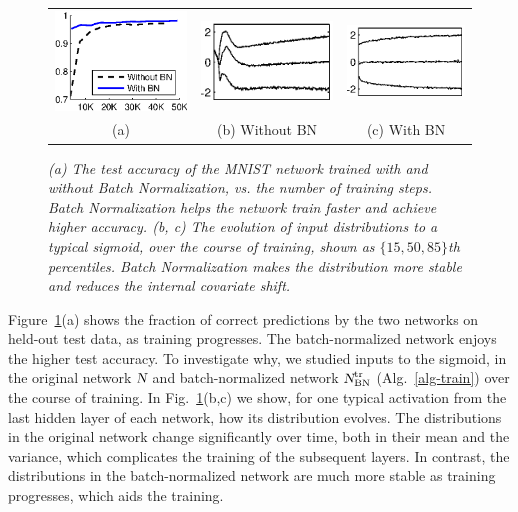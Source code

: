 \documentclass[twocolumn]{article}
\begin{document}
\begin{figure}
\centering
\begin{tabular}{@{}c@{\,}c@{}c@{}}
\includegraphics[width=0.28\columnwidth]{mnist.eps}
&
\includegraphics[width=0.35\columnwidth]{evo.eps}&
\includegraphics[width=0.35\columnwidth]{evo-bn.eps}\\
(a)&(b) Without BN&(c) With BN
\end{tabular} 
\caption{\em {\em(a)} The test accuracy of the MNIST network trained with and without Batch Normalization, vs. the number of training steps. Batch Normalization helps the network train faster and achieve higher accuracy. {\em(b, c)}   The evolution of input distributions to a typical sigmoid, over the course of training, shown as $\{15, 50, 85\}$th percentiles. Batch Normalization makes the distribution more stable and reduces the internal covariate shift.}
\label{fig-mnist}
\end{figure}

Figure~\ref{fig-mnist}(a) shows the fraction of correct predictions  by the two networks on
held-out test data, as training progresses. The batch-normalized network enjoys the higher test accuracy. To investigate why, we studied inputs to the sigmoid, in the original network $\text{\sl N}$ and  batch-normalized network $\text{\sl N}_\mathrm{BN}^\mathrm{tr}$ (Alg.~\ref{alg-train}) over the course of training. In Fig.~\ref{fig-mnist}(b,c) we show, for one typical activation from the last hidden layer of each network, how its distribution evolves.  The distributions in the original network
change significantly over time, both in their mean and the variance, which complicates the training of the subsequent layers.  In
contrast, the distributions in the batch-normalized network are much more stable
as training progresses, which aids the training.
\end{document}
